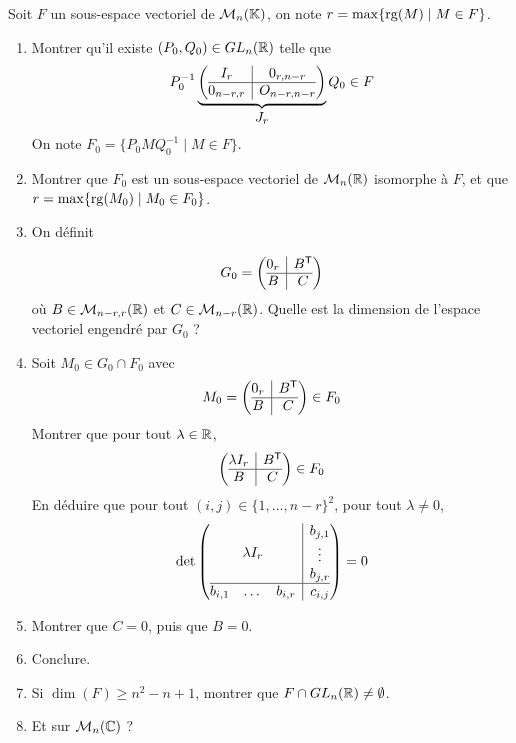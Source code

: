 \documentclass[12pt]{article}
\begin{document}
\begin{exercise}
	Soit $F$ un sous-espace vectoriel de $\mathcal{M}_{n}(\mathbb{K})$, on note $r=\max\{\operatorname{rg}(M)\mid
	M\in F \}$.
	\begin{enumerate}
		\item
		Montrer qu'il existe $(P_{0},Q_{0})\in GL_{n}(\mathbb{R})$ telle que 
		$$
		P_{0}^{-1}
		\underbrace{
			\left(
				\begin{array}{@{}c|c@{}}
					I_{r}
					& 0_{r,n-r} \\
					\hline
					0_{n-r,r} &
					O_{n-r,n-r}
				\end{array}\right)
		}_{\displaystyle J_{r}}
		Q_{0}\in F
		$$
		On note $F_{0}=\{P_{0}MQ_{0}^{-1}\mid M\in F\}$.
		\item
		Montrer que $F_{0}$ est un sous-espace vectoriel de $\mathcal{M}_{n}(\mathbb{R})$ isomorphe
		à $F$, et que \\$r=\max\{\operatorname{rg}(M_{0})\mid M_{0}\in F_{0}\}$.
		\item
		On définit
		
		$$G_{0}= \left(
				\begin{array}{@{}c|c@{}}
					0_{r}
					& B^{\mathsf{T}} \\
					\hline
					B & C \end{array}\right)
		$$
		où $B\in\mathcal{M}_{n-r,r}(\mathbb{R})$ et $C\in\mathcal{M}_{n-r}(\mathbb{R})$. 
		Quelle est la dimension de l'espace vectoriel engendré par $G_{0}$ ?
		\item Soit $M_{0}\in G_{0}\cap F_{0}$ avec 
		$$
			M_{0}= \left(
				\begin{array}{@{}c|c@{}}
					0_{r}
					& B^{\mathsf{T}} \\
					\hline
					B & C
				\end{array}
			\right)
			\in
			F_{0}
		$$
		Montrer que pour tout $\lambda\in\mathbb{R}$,
		$$
			\left(
				\begin{array}{@{}c|c@{}}
				\lambda
				I_{r} & B^{\mathsf{T}} \\
					\hline
					B & C
				\end{array}
			\right)
			\in
			F_{0}
		$$
		En déduire que pour tout $(i,j)\in\{1,\dots, n-r\}^{2}$, pour tout $\lambda\neq0$,
		$$
		\det\left(
				\begin{array}{@{}c|c@{}}
				\lambda
				I_{r} &
				\begin{matrix}
				b_{j,1}\\
						\vdots\\
						b_{j,r}
						\end{matrix}
						\\
					\hline
					\begin{matrix}
						b_{i,1} &
						\dots
						& b_{i,r}
						\end{matrix}
						& c_{i,j}
				\end{array}
			\right)=0
		$$
		\item Montrer que $C=0$, puis que $B=0$.
		\item Conclure.
		\item Si $\dim(F)\geqslant n^{2}-n+1$, montrer que $F\cap GL_{n}(\mathbb{R})\neq\emptyset$.
		\item Et sur $\mathcal{M}_{n}(\mathbb{C})$ ?
	\end{enumerate}
\end{exercise}
\end{document}
